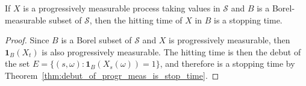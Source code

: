 
\begin{theorem}\label{thm:hitting_is_stopping_time}
  \leanok
If $X$ is a progressively measurable process taking values in $\mathcal{S}$ and $B$ is a Borel-measurable subset of $\mathcal{S}$, then the hitting time of $X$ in $B$ is a stopping time.
\end{theorem}

\begin{proof}
  Since $B$ is a Borel subset of $\mathcal{S}$ and $X$ is progressively measurable,
  then $\mathbf{1}_B(X_t)$ is also progressively measurable. The hitting time is then the debut of the set
  $E = \{(s,\omega) : \mathbf{1}_B(X_s(\omega)) = 1\}$, and therefore is a stopping time by Theorem~\ref{thm:debut_of_progr_meas_is_stop_time}.
\end{proof}
